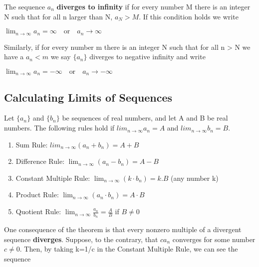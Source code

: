 \documentclass[12pt,a4paper]{article}
\newenvironment{definition}{\begin{definitionbox}}{\end{definitionbox}\vspace{1\baselineskip}}
\newenvironment{theorem}{\begin{theorembox}}{\end{theorembox}\vspace{1\baselineskip}}
\begin{document}
\smallskip

\begin{definition}
The sequence $a_n$ \textbf{diverges to infinity} if for every number M 
there is an integer N such that for all n larger than N, $a_N>M$. If this condition holds we write
\begin{center}
    $
    \lim_{n \to \infty} a_n = \infty \quad \text{or} \quad a_n \to \infty
    $
\end{center}
Similarly, if for every number m there is an integer N such that for all n > N we have a $a_n < m$ we say $\{a_n\}$ diverges to negative infinity and write

\begin{center}
    $
    \lim_{n \to \infty} a_n = - \infty \quad \text{or} \quad a_n \to -\infty
    $
\end{center}

\end{definition}

\subsection{Calculating Limits of Sequences}


\begin{theorem}
    
    Let $\{a_n\}$ and $\{b_n\}$ be sequences of real numbers, and let A and B be real numbers. The following rules hold if $lim_{n \to \infty} a_n = A$ and $lim_{n \to \infty} b_n = B$. 

    \begin{enumerate}
        \item Sum Rule: \quad \quad $lim_{n \to \infty}(a_n +b_n) = A + B $
        \item Difference Rule: \quad \quad $\lim_{n \to \infty}(a_n - b_n)= A-B$
        \item Constant Multiple Rule: \quad \quad $\lim_{n \to \infty}(k \cdot b_n) = k.B$ (any number k)
        \item Product Rule: \quad \quad $\lim_{n \to \infty}(a_n \cdot b_n)= A \cdot B$
        \item Quotient Rule: \quad \quad $\lim_{n \to \infty} \frac{a_n}{b_n}=\frac{A}{B}$ if $ B \neq 0 $ 
    \end{enumerate}

\end{theorem}

\smallskip
One consequence of the theorem is that every nonzero multiple of a divergent sequence \textbf{diverges}. Suppose, to the contrary, that $ca_n$ converges for some number $c \neq 0$. Then, by taking k=1/c in the Constant Multiple Rule, we can see the sequence
\end{document}
